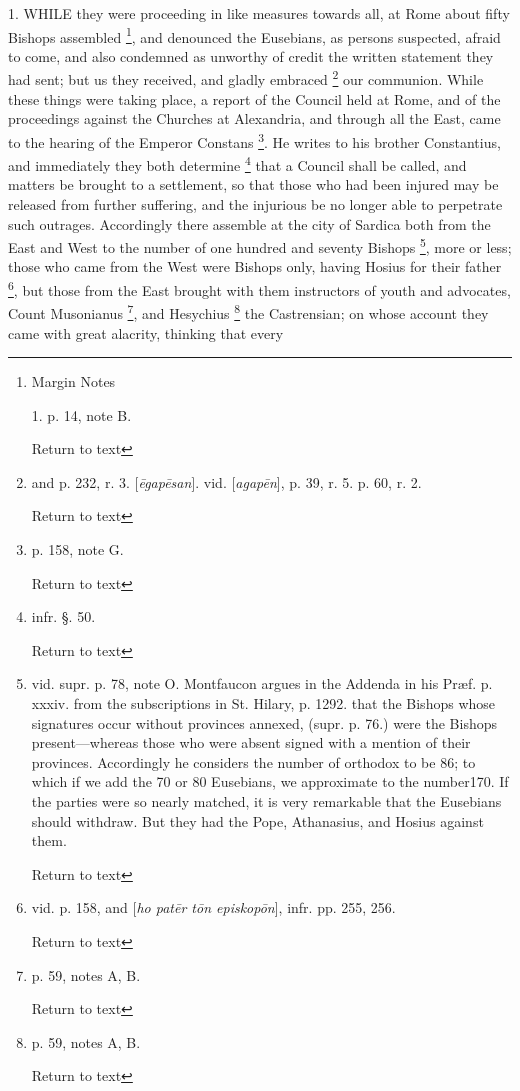 1. WHILE
they were proceeding in like measures towards all, at Rome about fifty
Bishops assembled \footnote{Margin Notes

1. p. 14, note B.

Return to text}, and
denounced the Eusebians, as persons suspected, afraid to come, and
also condemned as unworthy of credit the written statement they had
sent; but us they received, and gladly embraced \footnote{and p. 232, r. 3. [\emph{\={e}gap\={e}san}]. vid. [\emph{agap\={e}n}],
p. 39, r. 5. p. 60, r. 2.

Return to text} our communion. While these things were taking place, a report
of the Council held at Rome, and of the proceedings against the
Churches at Alexandria, and through all the East, came to the hearing
of the Emperor Constans \footnote{p. 158, note G.

Return to text}.
He writes to his brother Constantius, and immediately they both
determine \footnote{infr. §. 50.

Return to text} that a
Council shall be called, and matters be brought to a settlement, so
that those who had been injured may be released from further
suffering, and the injurious be no longer able to perpetrate such
outrages. Accordingly there assemble at the city of Sardica both from
the East and West to the number of one hundred and seventy Bishops \footnote{vid. supr. p. 78, note O. Montfaucon argues in
the Addenda in his Præf. p. xxxiv. from the subscriptions in St.
Hilary, p. 1292. that the Bishops whose signatures occur without
provinces annexed, (supr. p. 76.) were the Bishops present—whereas
those who were absent signed with a mention of their provinces.
Accordingly he considers the number of orthodox to be 86; to which if
we add the 70 or 80 Eusebians, we approximate to the number170. If the
parties were so nearly matched, it is very remarkable that the
Eusebians should withdraw. But they had the Pope, Athanasius, and
Hosius against them.

Return to text}, more or less; those who came from the West were Bishops only,
having Hosius for their father \footnote{vid. p. 158, and [\emph{ho pat\={e}r t\={o}n episkop\={o}n}],
infr. pp. 255, 256.

Return to text}, but those from the East brought with them instructors of youth
and advocates, Count Musonianus \footnote{p. 59, notes A, B.

Return to text}, and Hesychius \footnote{p. 59, notes A, B.

Return to text} the Castrensian;
on whose account they came with great alacrity, thinking that every

